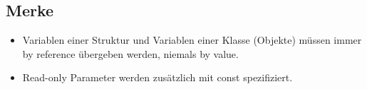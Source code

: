 \subsection{Merke}
\begin{itemize}
\item Variablen einer Struktur und Variablen einer Klasse (Objekte) müssen immer by reference übergeben werden, niemals by value.
\item Read-only Parameter werden zusätzlich mit const spezifiziert.
\end{itemize}